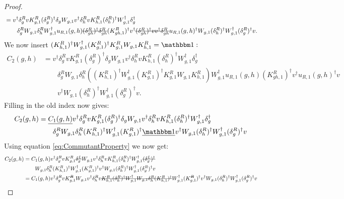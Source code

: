 \documentclass[12pt,a4paper,twoside]{article}
\numberwithin{equation}{section}
\begin{document}
\begin{proof}
\begin{align}
		&=v^\dagger \delta_g^R v K_{g,1}^R (\delta_g^R)^\dagger \delta_g W_{g,1}v^\dagger \delta_h^R v K_{h,1}^R (\delta_h^R)^\dagger W_{g,1}^\dagger \delta_g^\dagger\\
		\nonumber
		&\qquad \delta_g^R W_{g,1}\delta_h^R W_{g,1}^\dagger u_{R,1}(g,h)\stkout{(\delta_{gh}^R)^\dagger \delta_{gh}^R} (K_{gh,1}^R)^\dagger v^\dagger \stkout{(\delta_{gh}^R)^\dagger v  v^\dagger \delta^R_{gh}} u_{R,1}(g,h)^\dagger W_{g,1}(\delta^R_h)^\dagger W_{g,1}^\dagger(\delta_g^R)^\dagger v.
	\end{align}
	We now insert $(K_{h,1}^R)^\dagger W_{g,1}^\dagger (K_{g,1}^R)^\dagger K_{g,1}^R W_{g,1}K_{h,1}^R=\id:$
	\begin{align}	
		C_2(g,h)&=v^\dagger \delta_g^R v K_{g,1}^R (\delta_g^R)^\dagger \delta_g W_{g,1}v^\dagger \delta_h^R v K_{h,1}^R (\delta_h^R)^\dagger W_{g,1}^\dagger \delta_g^\dagger\\
		\nonumber
		&\qquad \delta_g^R W_{g,1}\delta_h^R \left((K_{h,1}^R)^\dagger W_{g,1}^\dagger (K_{g,1}^R)^\dagger K_{g,1}^R W_{g,1}K_{h,1}^R\right) W_{g,1}^\dagger u_{R,1}(g,h) (K_{gh,1}^R)^\dagger v^\dagger u_{R,1}(g,h)^\dagger v\\
		\nonumber
		&\qquad v^\dagger W_{g,1}(\delta^R_h)^\dagger W_{g,1}^\dagger(\delta_g^R)^\dagger v.
	\end{align}
	Filling in the old index now gives:
	\begin{align}
		C_2(g,h)&=\underline{C_1(g,h)}v^\dagger \delta_g^R v K_{g,1}^R (\delta_g^R)^\dagger \delta_g W_{g,1}v^\dagger \delta_h^R v K_{h,1}^R (\delta_h^R)^\dagger W_{g,1}^\dagger \delta_g^\dagger\\
		\nonumber
		&\qquad \delta_g^R W_{g,1}\delta_h^R (K_{h,1}^R)^\dagger W_{g,1}^\dagger (K_{g,1}^R)^\dagger \underline{\id} v^\dagger W_{g,1}(\delta^R_h)^\dagger W_{g,1}^\dagger(\delta_g^R)^\dagger v
	\end{align}
	Using equation \eqref{eq:CommutantProperty} we now get:
	\begin{align}
		C_2(g,h)&=C_1(g,h)v^\dagger \delta_g^R v K_{g,1}^R \stkout{\delta_g^L} W_{g,1}v^\dagger \delta_h^R v K_{h,1}^R (\delta_h^R)^\dagger W_{g,1}^\dagger \stkout{(\delta_g^L)^\dagger}\\
		\nonumber
		&\qquad  W_{g,1}\delta_h^R (K_{h,1}^R)^\dagger W_{g,1}^\dagger (K_{g,1}^R)^\dagger v^\dagger W_{g,1}(\delta^R_h)^\dagger W_{g,1}^\dagger(\delta_g^R)^\dagger v\\
		&=C_1(g,h)v^\dagger \delta_g^R v K_{g,1}^\stkout{R} W_{g,1}v^\dagger \delta_h^R v \stkout{K_{h,1}^R (\delta_h^R)^\dagger W_{g,1}^\dagger W_{g,1}\delta_h^R (K_{h,1}^R)^\dagger} W_{g,1}^\dagger (K_{g,1}^\stkout{R})^\dagger v^\dagger W_{g,1}(\delta^R_h)^\dagger W_{g,1}^\dagger(\delta_g^R)^\dagger v\\

\end{align}
\end{proof}
\end{document}
